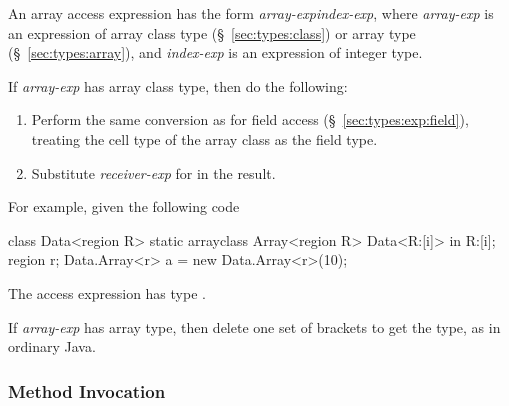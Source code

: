 An array access expression has the form
\emph{array-exp}\kwd{[}\emph{index-exp}\kwd{]}, where \emph{array-exp}
is an expression of array class type (\S~\ref{sec:types:class}) or
array type (\S~\ref{sec:types:array}), and \emph{index-exp} is an
expression of integer type.

 If \emph{array-exp} has array class type,
then do the following:
%
\begin{enumerate}
%
\item Perform the same conversion as for field access
  (\S~\ref{sec:types:exp:field}), treating the cell type of the array
  class as the field type.
%
\item Substitute \emph{receiver-exp} for  in the result.
%
\end{enumerate}
%
For example, given the following code
%
\begin{dpjlisting}
class Data<region R> {
  static arrayclass Array<region R> {
    Data<R:[i]> in R:[i];
  }
}
region r;
Data.Array<r> a = new Data.Array<r>(10);
\end{dpjlisting}
%
The access expression  has type .

 If \emph{array-exp} has array type, then delete
one set of brackets to get the type, as in ordinary Java.

\subsubsection{Method Invocation%
\label{sec:types:exp:invoke}}

